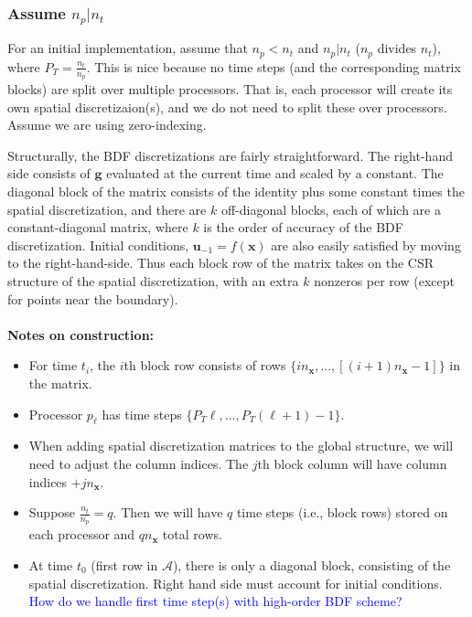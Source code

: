 \documentclass[a4paper,12pt]{article}
\newcommand{\tcb}{\textcolor{blue}}
\begin{document}
\subsubsection{Assume $n_p | n_t$}

For an initial implementation, assume that $n_p < n_t$ and $n_p | n_t$ ($n_p$ divides $n_t$), where $P_T = \frac{n_t}{n_p}$. This is nice
because no time steps (and the corresponding matrix blocks) are split over multiple processors. That is, each processor will create its own
spatial discretizaion(s), and we do not need to split these over processors. Assume we are using zero-indexing. 

Structurally, the BDF discretizations are fairly straightforward. The right-hand side consists of $\mathbf{g}$ evaluated at the current time
and scaled by a constant. The diagonal block of the matrix consists of the identity plus some constant times the spatial discretization, and
there are $k$ off-diagonal blocks, each of which are a constant-diagonal matrix, where $k$ is the order of accuracy of the BDF discretization. 
Initial conditions, $\mathbf{u}_{-1} = f(\mathbf{x})$ are also easily satisfied by moving to the right-hand-side. Thus each block row of the matrix
takes on the CSR structure of the spatial discretization, with an extra $k$ nonzeros per row (except for points near the boundary).\\
\\
\noindent\textbf{Notes on construction:}
\begin{itemize}
\item For time $t_i$, the $i$th block row consists of rows $\{in_{\mathbf{x}}, ...,[(i+1)n_{\mathbf{x}}-1]\}$ in the matrix. 
\item Processor $p_{\ell}$ has time steps $\{P_T\ell,...,P_T(\ell+1)-1\}$. 
\item When adding spatial discretization matrices to the global structure, we will need to adjust the column indices. The $j$th block column
will have column indices $+jn_{\mathbf{x}}$. 
\item Suppose $\frac{n_t}{n_p} = q$. Then we will have $q$ time steps (i.e., block rows) stored on each processor and $qn_{\mathbf{x}}$
total rows. 
\item At time $t_0$ (first row in $\mathcal{A}$), there is only a diagonal block, consisting of the spatial discretization. Right hand side must
account for initial conditions. \tcb{How do we handle first time step(s) with high-order BDF scheme?}

\end{itemize}
\end{document}
